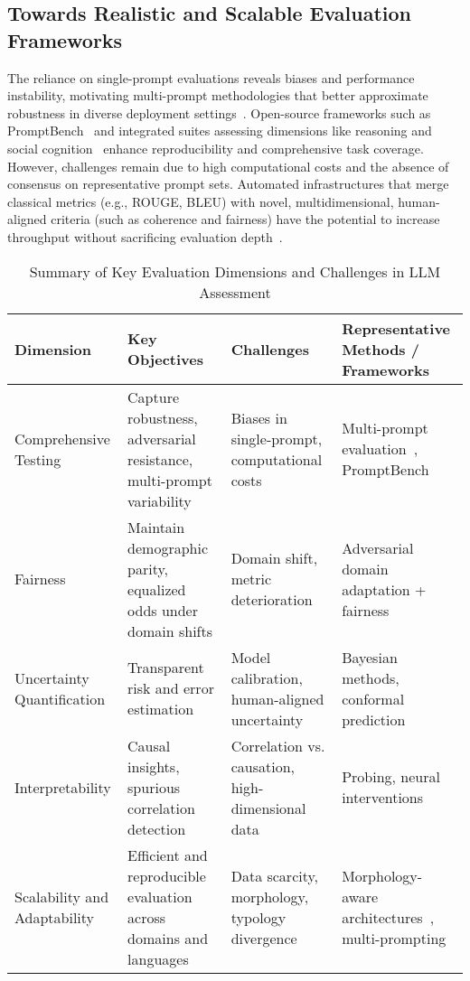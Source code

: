 \documentclass[sigconf]{acmart}
\begin{document}
\subsection{Towards Realistic and Scalable Evaluation Frameworks}

The reliance on single-prompt evaluations reveals biases and performance instability, motivating multi-prompt methodologies that better approximate robustness in diverse deployment settings~\cite{ref25}. Open-source frameworks such as PromptBench~\cite{ref11} and integrated suites assessing dimensions like reasoning and social cognition~\cite{ref17,ref21} enhance reproducibility and comprehensive task coverage. However, challenges remain due to high computational costs and the absence of consensus on representative prompt sets. Automated infrastructures that merge classical metrics (e.g., ROUGE, BLEU) with novel, multidimensional, human-aligned criteria (such as coherence and fairness) have the potential to increase throughput without sacrificing evaluation depth~\cite{ref31,ref39}.

\begin{table*}[htbp]
\centering
\caption{Summary of Key Evaluation Dimensions and Challenges in LLM Assessment}
\label{tab:evaluation_summary}
\begin{adjustbox}{max width=\textwidth}
\begin{tabular}{@{}llll@{}}
\toprule
\textbf{Dimension}           & \textbf{Key Objectives}                                                & \textbf{Challenges}                                  & \textbf{Representative Methods / Frameworks}           \\ \midrule
Comprehensive Testing        & Capture robustness, adversarial resistance, multi-prompt variability  & Biases in single-prompt, computational costs       & Multi-prompt evaluation~\cite{ref25}, PromptBench~\cite{ref11} \\
Fairness                    & Maintain demographic parity, equalized odds under domain shifts        & Domain shift, metric deterioration                   & Adversarial domain adaptation + fairness~\cite{ref41}          \\
Uncertainty Quantification  & Transparent risk and error estimation                                 & Model calibration, human-aligned uncertainty        & Bayesian methods, conformal prediction~\cite{ref35}            \\
Interpretability            & Causal insights, spurious correlation detection                        & Correlation vs. causation, high-dimensional data    & Probing, neural interventions~\cite{ref36}                      \\
Scalability and Adaptability & Efficient and reproducible evaluation across domains and languages    & Data scarcity, morphology, typology divergence       & Morphology-aware architectures~\cite{ref38}, multi-prompting  \\
\bottomrule
\end{tabular}
\end{adjustbox}
\end{table*}
\end{document}
